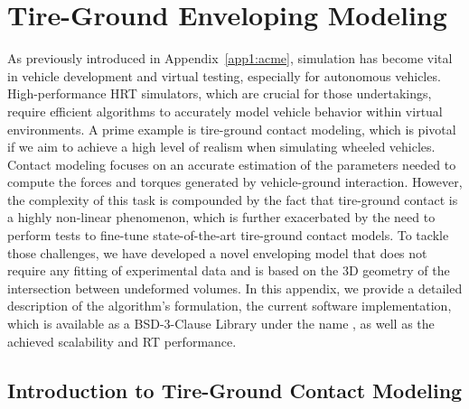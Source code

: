 
\chapter{Tire-Ground Enveloping Modeling}
\label{app2:enve}

As previously introduced in Appendix~\ref{app1:acme}, simulation has become vital in vehicle development and virtual testing, especially for autonomous vehicles. High-performance \ac{HRT} simulators, which are crucial for those undertakings, require efficient algorithms to accurately model vehicle behavior within virtual environments. A prime example is tire-ground contact modeling, which is pivotal if we aim to achieve a high level of realism when simulating wheeled vehicles. Contact modeling focuses on an accurate estimation of the parameters needed to compute the forces and torques generated by vehicle-ground interaction. However, the complexity of this task is compounded by the fact that tire-ground contact is a highly non-linear phenomenon, which is further exacerbated by the need to perform tests to fine-tune state-of-the-art tire-ground contact models. To tackle those challenges, we have developed a novel enveloping model that does not require any fitting of experimental data and is based on the 3D geometry of the intersection between undeformed volumes. In this appendix, we provide a detailed description of the algorithm's formulation, the current software implementation, which is available as a BSD-3-Clause Library under the name \Enve{}, as well as the achieved scalability and \ac{RT} performance.


\section{Introduction to Tire-Ground Contact Modeling}
\label{app2:sec:introduction}

